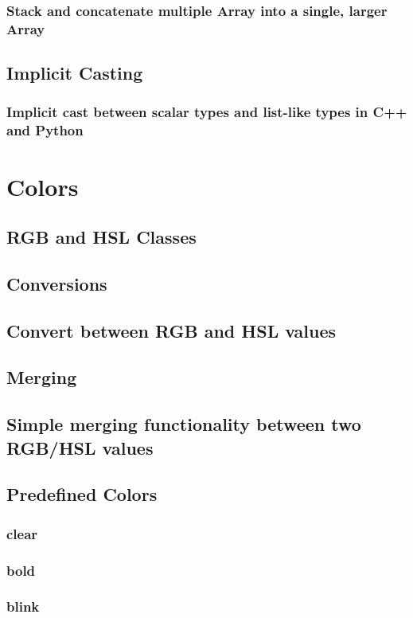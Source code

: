 \documentclass[10pt,a4paper]{report}
\begin{document}
			\subsubsection{Stack and concatenate multiple Array into a single, larger Array}
		\subsection{Implicit Casting}
			\subsubsection{Implicit cast between scalar types and list-like types in C++ and Python}

	\pagebreak

	\section{Colors}
		\subsection{RGB and HSL Classes}
		\subsection{Conversions}
			\subsection{Convert between RGB and HSL values}
		\subsection{Merging}
			\subsection{Simple merging functionality between two RGB/HSL values}
		\subsection{Predefined Colors}
			\subsubsection{clear}
			\subsubsection{bold}
			\subsubsection{blink}
\end{document}
